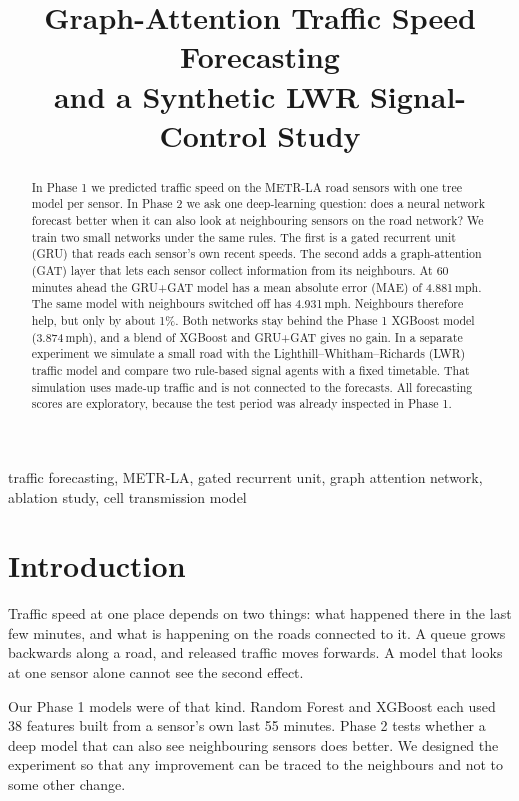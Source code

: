 \documentclass[conference]{IEEEtran}
\title{Graph-Attention Traffic Speed Forecasting\\and a Synthetic LWR Signal-Control Study}
\author{\IEEEauthorblockN{Kavya Katal, Rudraksh Sharma, Anshuman Mehta, Vridhi Chaudhary, Bineet Keshari}
\IEEEauthorblockA{Team T072, Section C, Rishihood University\\
Project 4, Phase 2 (Deep Learning) report, November 2026}}
\begin{document}
\maketitle

\begin{abstract}
In Phase 1 we predicted traffic speed on the METR-LA road sensors with one tree model per sensor. In Phase 2 we ask one deep-learning question: does a neural network forecast better when it can also look at neighbouring sensors on the road network? We train two small networks under the same rules. The first is a gated recurrent unit (GRU) that reads each sensor's own recent speeds. The second adds a graph-attention (GAT) layer that lets each sensor collect information from its neighbours. At 60 minutes ahead the GRU+GAT model has a mean absolute error (MAE) of 4.881\,mph. The same model with neighbours switched off has 4.931\,mph. Neighbours therefore help, but only by about 1\%. Both networks stay behind the Phase 1 XGBoost model (3.874\,mph), and a blend of XGBoost and GRU+GAT gives no gain. In a separate experiment we simulate a small road with the Lighthill--Whitham--Richards (LWR) traffic model and compare two rule-based signal agents with a fixed timetable. That simulation uses made-up traffic and is not connected to the forecasts. All forecasting scores are exploratory, because the test period was already inspected in Phase 1.
\end{abstract}

\begin{IEEEkeywords}
traffic forecasting, METR-LA, gated recurrent unit, graph attention network, ablation study, cell transmission model
\end{IEEEkeywords}

\section{Introduction}
Traffic speed at one place depends on two things: what happened there in the last few minutes, and what is happening on the roads connected to it. A queue grows backwards along a road, and released traffic moves forwards. A model that looks at one sensor alone cannot see the second effect.

Our Phase 1 models were of that kind. Random Forest and XGBoost each used 38 features built from a sensor's own last 55 minutes. Phase 2 tests whether a deep model that can also see neighbouring sensors does better. We designed the experiment so that any improvement can be traced to the neighbours and not to some other change.
\end{document}
